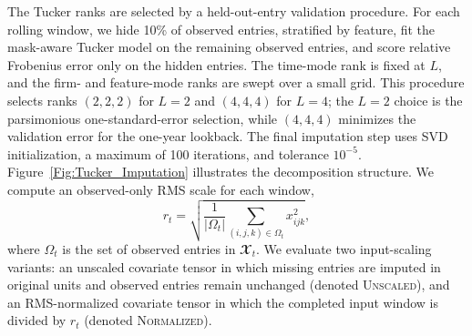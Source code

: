 \documentclass[pdflatex,sn-mathphys-num]{sn-jnl}%
\theoremstyle{thmstyleone}%
\theoremstyle{thmstyletwo}%
\theoremstyle{thmstylethree}%
\begin{document}
The Tucker ranks are selected by a held-out-entry validation procedure. For each rolling window, we hide 10\% of observed entries, stratified by feature, fit the mask-aware Tucker model on the remaining observed entries, and score relative Frobenius error only on the hidden entries. The time-mode rank is fixed at $L$, and the firm- and feature-mode ranks are swept over a small grid. This procedure selects ranks $(2,2,2)$ for $L=2$ and $(4,4,4)$ for $L=4$; the $L=2$ choice is the parsimonious one-standard-error selection, while $(4,4,4)$ minimizes the validation error for the one-year lookback. The final imputation step uses SVD initialization, a maximum of 100 iterations, and tolerance $10^{-5}$. Figure~\ref{Fig:Tucker_Imputation} illustrates the decomposition structure. We compute an observed-only RMS scale for each window,
\begin{equation}
r_t = \sqrt{\frac{1}{|\Omega_t|}\sum_{(i,j,k)\in\Omega_t} x_{ijk}^2},
\end{equation}
where $\Omega_t$ is the set of observed entries in $\mathbfcal{X}_t$. We evaluate two input-scaling variants: an unscaled covariate tensor in which missing entries are imputed in original units and observed entries remain unchanged (denoted \textsc{Unscaled}), and an RMS-normalized covariate tensor in which the completed input window is divided by $r_t$ (denoted \textsc{Normalized}).
\end{document}
